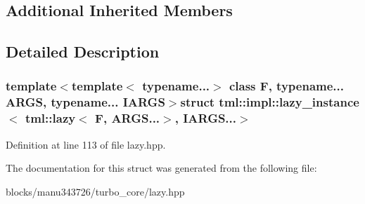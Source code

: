 \subsection*{Additional Inherited Members}


\subsection{Detailed Description}
\subsubsection*{template$<$template$<$ typename...$>$ class F, typename... A\+R\+G\+S, typename... I\+A\+R\+G\+S$>$struct tml\+::impl\+::lazy\+\_\+instance$<$ tml\+::lazy$<$ F, A\+R\+G\+S...$>$, I\+A\+R\+G\+S...$>$}



Definition at line 113 of file lazy.\+hpp.



The documentation for this struct was generated from the following file\+:\begin{DoxyCompactItemize}
\item 
blocks/manu343726/turbo\+\_\+core/lazy.\+hpp\end{DoxyCompactItemize}

